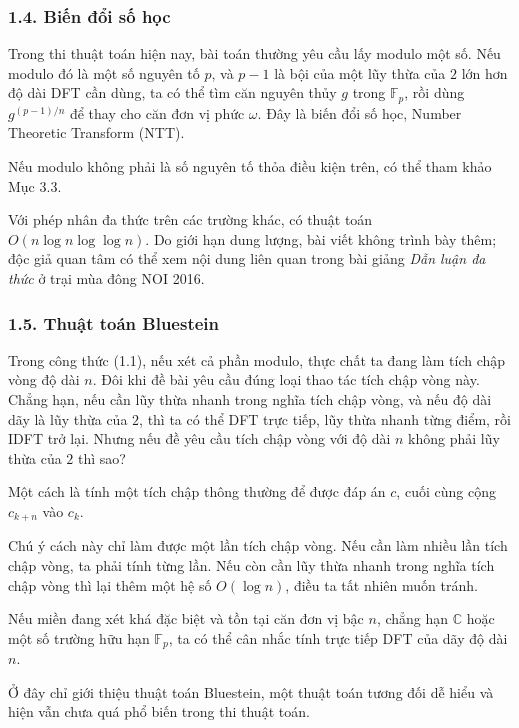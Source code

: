 \documentclass[11pt]{article}
\begin{document}
\subsubsection*{1.4. Biến đổi số học}

Trong thi thuật toán hiện nay, bài toán thường yêu cầu lấy modulo một số. Nếu
modulo đó là một số nguyên tố \(p\), và \(p-1\) là bội của một lũy thừa của
\(2\) lớn hơn độ dài DFT cần dùng, ta có thể tìm căn nguyên thủy \(g\) trong
\(\mathbb F_p\), rồi dùng \(g^{(p-1)/n}\) để thay cho căn đơn vị phức
\(\omega\). Đây là biến đổi số học, Number Theoretic Transform (NTT).

Nếu modulo không phải là số nguyên tố thỏa điều kiện trên, có thể tham khảo
Mục 3.3.

Với phép nhân đa thức trên các trường khác, có thuật toán
\(O(n\log n\log\log n)\). Do giới hạn dung lượng, bài viết không trình bày
thêm; độc giả quan tâm có thể xem nội dung liên quan trong bài giảng
\emph{Dẫn luận đa thức} ở trại mùa đông NOI 2016.

\subsubsection*{1.5. Thuật toán Bluestein}

Trong công thức (1.1), nếu xét cả phần modulo, thực chất ta đang làm tích chập
vòng độ dài \(n\). Đôi khi đề bài yêu cầu đúng loại thao tác tích chập vòng
này. Chẳng hạn, nếu cần lũy thừa nhanh trong nghĩa tích chập vòng, và nếu độ
dài dãy là lũy thừa của \(2\), thì ta có thể DFT trực tiếp, lũy thừa nhanh
từng điểm, rồi IDFT trở lại. Nhưng nếu đề yêu cầu tích chập vòng với độ dài
\(n\) không phải lũy thừa của \(2\) thì sao?

Một cách là tính một tích chập thông thường để được đáp án \(c\), cuối cùng
cộng \(c_{k+n}\) vào \(c_k\).

Chú ý cách này chỉ làm được một lần tích chập vòng. Nếu cần làm nhiều lần
tích chập vòng, ta phải tính từng lần. Nếu còn cần lũy thừa nhanh trong nghĩa
tích chập vòng thì lại thêm một hệ số \(O(\log n)\), điều ta tất nhiên muốn
tránh.

Nếu miền đang xét khá đặc biệt và tồn tại căn đơn vị bậc \(n\), chẳng hạn
\(\mathbb C\) hoặc một số trường hữu hạn \(\mathbb F_p\), ta có thể cân nhắc
tính trực tiếp DFT của dãy độ dài \(n\).

Ở đây chỉ giới thiệu thuật toán Bluestein, một thuật toán tương đối dễ hiểu
và hiện vẫn chưa quá phổ biến trong thi thuật toán.
\end{document}
